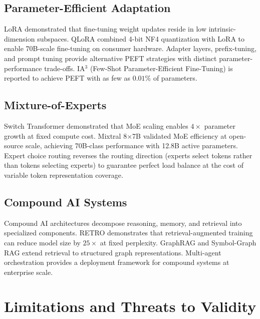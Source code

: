 \documentclass[10pt,twocolumn,letterpaper]{article}
\begin{document}
\subsection{Parameter-Efficient Adaptation}


LoRA \cite{crossref_10_48550_arxiv_2106_09685} demonstrated that fine-tuning weight updates reside in low intrinsic-dimension subspaces. QLoRA \cite{crossref_10_48550_arxiv_2305_14314} combined 4-bit NF4 quantization with LoRA to enable 70B-scale fine-tuning on consumer hardware. Adapter layers, prefix-tuning, and prompt tuning provide alternative PEFT strategies with distinct parameter-performance trade-offs. IA$^3$ (Few-Shot Parameter-Efficient Fine-Tuning) is reported to achieve PEFT with as few as $0.01\%$ of parameters.


\subsection{Mixture-of-Experts}


Switch Transformer demonstrated that MoE scaling enables $4\times$ parameter growth at fixed compute cost. Mixtral 8$\times$7B validated MoE efficiency at open-source scale, achieving 70B-class performance with 12.8B active parameters. Expert choice routing reverses the routing direction (experts select tokens rather than tokens selecting experts) to guarantee perfect load balance at the cost of variable token representation coverage.


\subsection{Compound AI Systems}


Compound AI architectures \cite{arxiv_2406_00584} decompose reasoning, memory, and retrieval into specialized components. RETRO demonstrates that retrieval-augmented training can reduce model size by $25\times$ at fixed perplexity. GraphRAG \cite{arxiv_2501_14050} and Symbol-Graph RAG extend retrieval to structured graph representations. Multi-agent orchestration \cite{arxiv_2404_01131,crossref_10_1109_access_2026_3656309} provides a deployment framework for compound systems at enterprise scale.




\section{Limitations and Threats to Validity}
\end{document}
